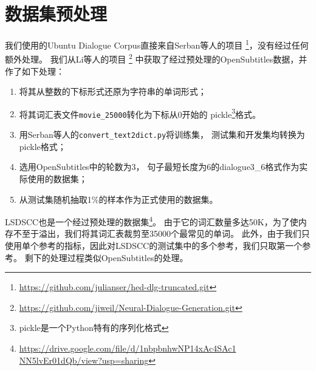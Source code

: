 \section{数据集预处理}
\label{sec:dataset_proprecessing}
我们使用的Ubuntu Dialogue Corpus直接来自Serban等人的项目
\footnote{\url{https://github.com/julianser/hed-dlg-truncated.git}}，没有经过任何额外处理。
我们从Li等人的项目
\footnote{\url{https://github.com/jiweil/Neural-Dialogue-Generation.git}}
中获取了经过预处理的OpenSubtitles数据，并作了如下处理：
\begin{enumerate}
    \item 将其从整数的下标形式还原为字符串的单词形式；
    \item 将其词汇表文件\texttt{movie\_25000}转化为下标从0开始的 pickle\footnote{pickle是一个Python特有的序列化格式}格式。
    \item 用Serban等人的\texttt{convert\_text2dict.py}将训练集，
    测试集和开发集均转换为pickle格式；
    \item 选用OpenSubtitles中的轮数为3， 句子最短长度为6的dialogue3\_6格式作为实际使用的数据集；
    \item 从测试集随机抽取1\%的样本作为正式使用的数据集。
\end{enumerate}

LSDSCC也是一个经过预处理的数据集\footnote{\url{https://drive.google.com/file/d/1nbpbnhwNP14xAc4SAc1 NN5lvEr01dQb/view?usp=sharing}}。
由于它的词汇数量多达50K，为了使内存不至于溢出，我们将其词汇表裁剪至35000个最常见的单词。
此外，由于我们只使用单个参考的指标，因此对LSDSCC的测试集中的多个参考，我们只取第一个参考。
剩下的处理过程类似OpenSubtitles的处理。

